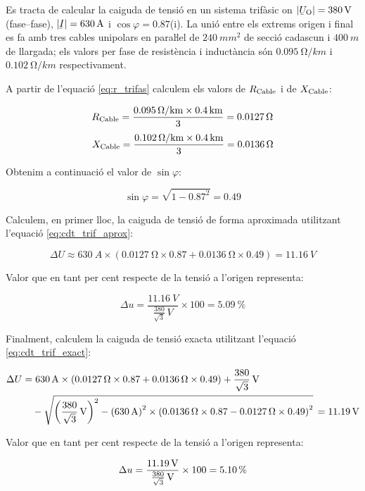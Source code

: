 \begin{exemple}\label{ex:CaigudaDeTensio}
	\addcontentsxms{\CaigudaDeTensio}
       Es tracta de calcular la caiguda de tensió en un sistema trifàsic on $|\cmplx{U}\ped{O}| = \qty{380}{V}$ (fase--fase), $|\cmplx{I}|=\qty{630}{A}$ i $\cos \varphi = \num{0,87}$(i). La unió entre els extrems origen  i final es fa amb tres cables unipolars en paraŀlel de $\qty{240}{mm^2}$ de secció cadascun i $\qty{400}{m}$ de llargada; els valors per fase de resistència i inductància són $\qty{0,095}{\ohm/km}$ i $\qty{0,102}{\ohm/km}$ respectivament.

    A partir de l'equació \eqref{eq:r_trifas} calculem els valors de $R_\mathrm{Cable}$ i de $X_\mathrm{Cable}$:

    \[
       R_\mathrm{Cable} = \frac{\qty{0,095}{\ohm/km}\times \qty{0,4}{km}}{3} = \qty{0,0127}{\ohm}
    \]
    \[
       X_\mathrm{Cable} = \frac{\qty{0,102}{\ohm/km}\times \qty{0,4}{km}}{3} = \qty{0,0136}{\ohm}
    \]

    Obtenim a continuació el valor de $\sin \varphi$:

    \[
       \sin \varphi = \sqrt{1-\num{0,87}^2} = \num{0,49}
    \]

    Calculem, en primer lloc, la caiguda de tensió de forma aproximada utilitzant l'equació \eqref{eq:cdt_trif_aprox}:

    \[
       \Delta U \approx \qty{630}{A} \times ( \qty{0,0127}{\ohm} \times \num{0,87} + \qty{0,0136}{\ohm} \times \num{0,49} ) = \qty{11,16}{V}
    \]

    Valor que en tant per cent respecte de la tensió a l'origen representa:

    \[
        \Delta u = \frac{\qty{11,16}{V}}{\frac{380}{\sqrt{3}}\unit{\,V}} \times 100 = \qty{5,09}{\percent}
    \]

    Finalment, calculem la caiguda de tensió exacta utilitzant l'equació \eqref{eq:cdt_trif_exact}:

    \[ \begin{split}
       \Delta U &=  \qty{630}{A} \times( \qty{0,0127}{\ohm} \times \num{0,87} + \qty{0,0136}{\ohm} \times \num{0,49}) + \qty[parse-numbers = false]{\frac{380}{\sqrt{3}}}{V}  \\
        & \quad - \sqrt{\left(\qty[parse-numbers = false]{\frac{380}{\sqrt{3}}}{V}\right)^2 - \left(\qty{630}{A}\right)^2 \times  \left( \qty{0,0136}{\ohm} \times \num{0,87} - \qty{0,0127}{\ohm} \times \num{0,49} \right)^2 } \,= \qty{11,19}{V}
    \end{split} \]

    Valor que en tant per cent respecte de la tensió a l'origen representa:

    \[
        \Delta u = \frac{\qty{11,19}{V}}{\qty[parse-numbers = false]{\frac{380}{\sqrt{3}}}{V}} \times 100 = \qty{5,10}{\percent}
    \]
\end{exemple}

